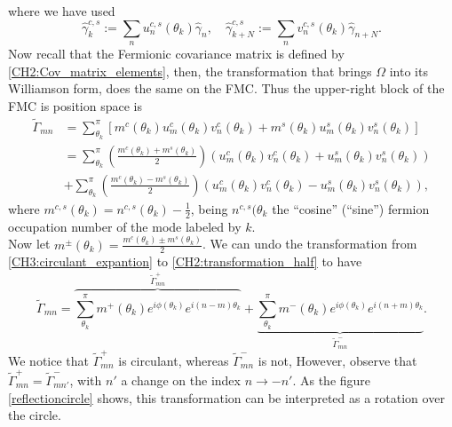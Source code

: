 where we have used
\begin{equation}
\hat{\gamma}_{k}^{c, s}:=\sum_{n} u_{n}^{c, s}\left(\theta_{k}\right) \hat{\gamma}_{n}, \quad \hat{\gamma}_{k+N}^{c, s}:=\sum_{n} v_{n}^{c, s}\left(\theta_{k}\right) \hat{\gamma}_{n+N}.
\end{equation}
Now recall that the Fermionic covariance matrix is defined by \eqref{CH2:Cov_matrix_elements}, then, the transformation that brings $\Omega$ into its Williamson form, does the same on the FMC. Thus the upper-right block of the FMC is position space is 
\begin{equation}
\begin{aligned}
\tilde{\Gamma}_{m n} &=\sum_{\theta_{k}}^{\pi}\left[m^{c}\left(\theta_{k}\right) u_{m}^{c}\left(\theta_{k}\right) v_{n}^{c}\left(\theta_{k}\right)+m^{s}\left(\theta_{k}\right) u_{m}^{s}\left(\theta_{k}\right) v_{n}^{s}\left(\theta_{k}\right)\right] \\
&=\sum_{\theta_{k}}^{\pi}\left(\frac{m^{c}\left(\theta_{k}\right)+m^{s}\left(\theta_{k}\right)}{2}\right)\left(u_{m}^{c}\left(\theta_{k}\right) v_{n}^{c}\left(\theta_{k}\right)+u_{m}^{s}\left(\theta_{k}\right) v_{n}^{s}\left(\theta_{k}\right)\right) \\
&+\sum_{\theta_{k}}^{\pi}\left(\frac{m^{c}\left(\theta_{k}\right)-m^{s}\left(\theta_{k}\right)}{2}\right)\left(u_{m}^{c}\left(\theta_{k}\right) v_{n}^{c}\left(\theta_{k}\right)-u_{m}^{s}\left(\theta_{k}\right) v_{n}^{s}\left(\theta_{k}\right)\right),
\end{aligned}
\end{equation}
where $m^{c,s}(\theta_k) = n^{c,s}(\theta_k) -\frac{1}{2}$, being $n^{c,s}(\theta_k$ the ``cosine'' (``sine'') fermion occupation number of the mode labeled by $k$.\\
Now let $m^{\pm}\left(\theta_{k}\right)=\frac{m^{c}\left(\theta_{k}\right) \pm m^{s}\left(\theta_{k}\right)}{2}$. We can undo the transformation from \eqref{CH3:circulant_expantion} to \eqref{CH2:transformation_half} to have
\begin{equation}
\tilde{\Gamma}_{m n}=\overbrace{\sum_{\theta_{k}}^{\pi} m^{+}\left(\theta_{k}\right) e^{i \phi\left(\theta_{k}\right)} e^{i(n-m) \theta_{k}}}^{\tilde{\Gamma}^{+}_{mn}}+\underbrace{\sum_{\theta_{k}}^{\pi} m^{-}\left(\theta_{k}\right) e^{i \phi\left(\theta_{k}\right)} e^{i(n+m) \theta_{k}}}_{\tilde{\Gamma}_{m n}^{-}}.
\label{CH2:Decomposition_FMC}
\end{equation}
We notice that $\tilde{\Gamma}^{+}_{mn}$ is circulant, whereas $\tilde{\Gamma}^{-}_{mn}$ is not, However, observe that $\tilde{\Gamma}^{+}_{mn} = \tilde{\Gamma}^{-}_{mn'}$, with $n'$ a change on the index $n\to -n'$. As the figure \ref{reflectioncircle} shows, this transformation can be interpreted as a rotation over the circle.
